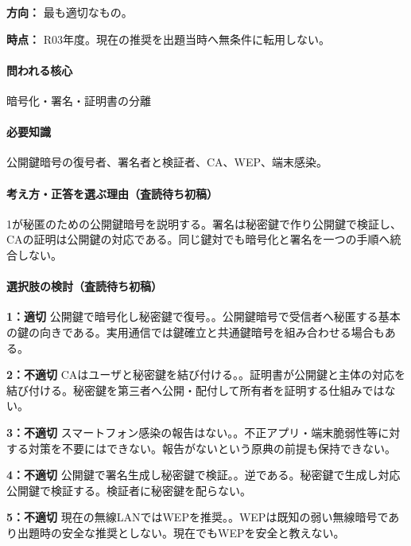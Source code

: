 \noindent\textbf{方向：} 最も適切なもの。\par

\noindent\textbf{時点：} R03年度。現在の推奨を出題当時へ無条件に転用しない。\par

\paragraph{問われる核心} 暗号化・署名・証明書の分離

\paragraph{必要知識} 公開鍵暗号の復号者、署名者と検証者、CA、WEP、端末感染。

\paragraph{考え方・正答を選ぶ理由（査読待ち初稿）} 1が秘匿のための公開鍵暗号を説明する。署名は秘密鍵で作り公開鍵で検証し、CAの証明は公開鍵の対応である。同じ鍵対でも暗号化と署名を一つの手順へ統合しない。

\paragraph{選択肢の検討（査読待ち初稿）}\mbox{}\par

\noindent\textbf{1：適切} 公開鍵で暗号化し秘密鍵で復号。。公開鍵暗号で受信者へ秘匿する基本の鍵の向きである。実用通信では鍵確立と共通鍵暗号を組み合わせる場合もある。\par

\noindent\textbf{2：不適切} CAはユーザと秘密鍵を結び付ける。。証明書が公開鍵と主体の対応を結び付ける。秘密鍵を第三者へ公開・配付して所有者を証明する仕組みではない。\par

\noindent\textbf{3：不適切} スマートフォン感染の報告はない。。不正アプリ・端末脆弱性等に対する対策を不要にはできない。報告がないという原典の前提も保持できない。\par

\noindent\textbf{4：不適切} 公開鍵で署名生成し秘密鍵で検証。。逆である。秘密鍵で生成し対応公開鍵で検証する。検証者に秘密鍵を配らない。\par

\noindent\textbf{5：不適切} 現在の無線LANではWEPを推奨。。WEPは既知の弱い無線暗号であり出題時の安全な推奨としない。現在でもWEPを安全と教えない。\par

